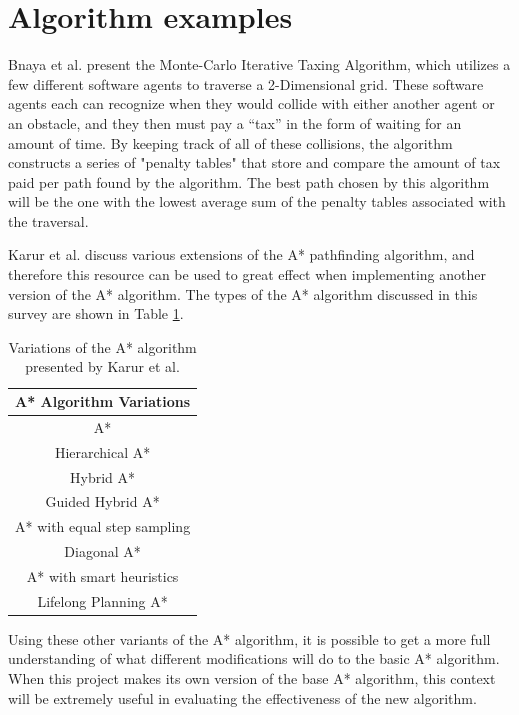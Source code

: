 \section{Algorithm examples}
Bnaya et al. \cite{bnaya2013multi} present the Monte-Carlo Iterative Taxing Algorithm, which utilizes a few different software agents to traverse a 2-Dimensional grid. These software agents each can recognize when they would collide with either another agent or an obstacle, and they then must pay a “tax” in the form of waiting for an amount of time. By keeping track of all of these collisions, the algorithm constructs a series of "penalty tables" that store and compare the amount of tax paid per path found by the algorithm. The best path chosen by this algorithm will be the one with the lowest average sum of the penalty tables associated with the traversal.
\par
Karur et al. \cite{karur2021survey} discuss various extensions of the A* pathfinding algorithm, and therefore this resource can be used to great effect when implementing another version of the A* algorithm. The types of the A* algorithm discussed in this survey are shown in Table \ref{tab:algvariations}.
\begin{table}[H]\centering\footnotesize
    \caption{Variations of the A* algorithm presented by Karur et al.}\label{tab:algvariations}
    \begin{tabular}{|c|}
        \hline
        \textbf{A* Algorithm Variations} \\ \hline
        A* \\ \hline
        Hierarchical A* \\ \hline
        Hybrid A* \\ \hline
        Guided Hybrid A* \\ \hline
        A* with equal step sampling \\ \hline
        Diagonal A* \\ \hline
        A* with smart heuristics \\ \hline
        Lifelong Planning A* \\ \hline
    \end{tabular}
\end{table}
Using these other variants of the A* algorithm, it is possible to get a more full understanding of what different modifications will do to the basic A* algorithm. When this project makes its own version of the base A* algorithm, this context will be extremely useful in evaluating the effectiveness of the new algorithm.
\par
